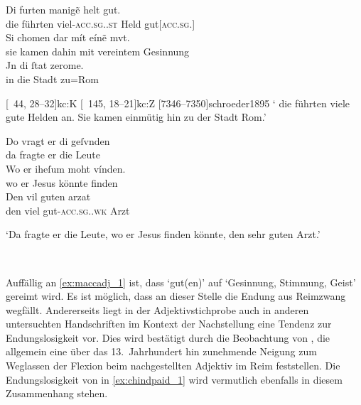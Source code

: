 \begin{exe}
\ex \label{ex:maccadj}
	\begin{xlist}
	\ex \label{ex:maccadj_1}
		\gll Di furten manigẽ helt gut. \\
			die führten viel-\textsc{acc.sg.\MascM.st} Held
			gut[\textsc{acc.sg.\MascM}] \\
	\sn \gll Si chomen dar mít eínẽ mvt. \\
			sie kamen dahin mit vereintem Gesinnung \\
	\sn \gll Jn di ſtat zerome. \\
			in die Stadt zu=Rom \\
		\begin{taggedline}{\parencites%
			[\pno~55\vb, 20--24]{kc:M}[vgl.]%
			[\pno~31\vb, 27--31]{kc:A1}
			[\pno~43\vb,15--19]{kc:H}
			[\pno~38\va, 18--21]{kc:C1}
			[\pno~44\rb, 28--32]{kc:K}
			[\pno~145\ra, 18--21]{kc:Z}
			[7346--7350]{schroeder1895}
		}
		\trans `\textelp{} die führten viele gute Helden an. Sie kamen einmütig 	hin zu der Stadt Rom.'
		\end{taggedline}

	\ex \label{ex:maccadj_2}
		\gll Do vragt er di geſvnden \\
			da fragte er die Leute \\
	\sn \gll Wo er iheſum moht vínden. \\
			wo er Jesus könnte finden \\
	\sn \gll Den vil guten arzat \\
			den viel gut-\textsc{acc.sg.\MascM.wk} Arzt \\
		\begin{taggedline}{\parencites%
			[\pno~6\rb, 31]{kc:M}[vgl.]%
			[\pno~3\vb, 26--28]{kc:A1}
			[\pno~4\rb, 28--30]{kc:H}
			[\pno~4\rb, 35--36]{kc:B1}
			[\pno~7\ra, 9--10]{kc:P}
			[\pno~4\ra, 24--27]{kc:C1}
			[\pno~12\va, 12--15]{kc:Z}
			[723--725]{schroeder1895}
		}
		\trans `Da fragte er die Leute, wo er Jesus finden
			könnte, den sehr guten Arzt.'%
		\end{taggedline}
		\\
	\end{xlist}
\end{exe}

Auffällig an \cref{ex:maccadj_1} ist, dass  `gut(en)' auf
 `Gesinnung, Stimmung, Geist' gereimt wird. Es ist möglich,
dass an dieser Stelle die Endung aus Reimzwang wegfällt. Andererseits liegt in
der Adjektivstichprobe auch in anderen untersuchten Handschriften im Kontext
der Nachstellung eine Tendenz zur Endungslosigkeit vor. Dies wird bestätigt
durch die Beobachtung von \citet[241]{ksw2}, die allgemein eine über das
13.~Jahrhundert hin zunehmende Neigung zum Weglassen der Flexion beim
nachgestellten Adjektiv im Reim feststellen. Die Endungslosigkeit von
 in \cref{ex:chindpaid_1} wird vermutlich ebenfalls in diesem
Zusammenhang stehen.


